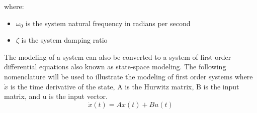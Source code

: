 where:
\begin{itemize}
 \item[] $\omega_0$ is the system natural frequency in radians per second
 \item[] $\zeta$ is the system damping ratio
\end{itemize}

The modeling of a system can also be converted to a system of first order differential equations also known as state-space modeling.  The following nomenclature will be used to illustrate the modeling of first order systems where $\dot{x}$ is the time derivative of the state, A is the Hurwitz matrix, B is the input matrix, and u is the input vector.
\begin{equation}\label{eq:state_space_model}
\dot{x}(t)=Ax(t)+Bu(t)
\end{equation}